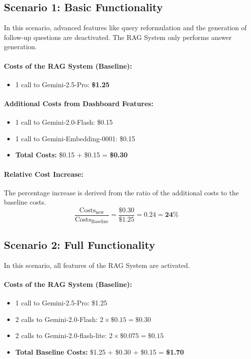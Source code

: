 \documentclass[
	english,
	ruledheaders=section,%
	class=report,%
	thesis={type=bachelor},%
	accentcolor=1b,%
	custommargins=true,%
	marginpar=false,%
	parskip=half-,%
	fontsize=11pt,%
	DIV=14,
]{tudapub}
\begin{document}
\subsection*{Scenario 1: Basic Functionality}
In this scenario, advanced features like query reformulation and the generation of follow-up questions are deactivated. The RAG System only performs answer generation.

\paragraph{Costs of the RAG System (Baseline):}
\begin{itemize}
    \item 1 call to Gemini-2.5-Pro: \textbf{\$1.25}
\end{itemize}

\paragraph{Additional Costs from Dashboard Features:}
\begin{itemize}
    \item 1 call to Gemini-2.0-Flash: \$0.15
    \item 1 call to Gemini-Embedding-0001: \$0.15
    \item \textbf{Total Costs:} \$0.15 + \$0.15 = \textbf{\$0.30}
\end{itemize}

\paragraph{Relative Cost Increase:}
The percentage increase is derived from the ratio of the additional costs to the baseline costs.
\begin{equation*}
\frac{\text{Costs}_\text{new}}{\text{Costs}_\text{Baseline}} = \frac{\$0.30}{\$1.25} = 0.24 = \textbf{24\%}
\end{equation*}
\subsection*{Scenario 2: Full Functionality}
In this scenario, all features of the RAG System are activated.

\paragraph{Costs of the RAG System (Baseline):}
\begin{itemize}
    \item 1 call to Gemini-2.5-Pro: \$1.25
    \item 2 calls to Gemini-2.0-Flash: $2 \times \$0.15 = \$0.30$
    \item 2 calls to Gemini-2.0-flash-lite: $2 \times \$0.075 = \$0.15$
    \item \textbf{Total Baseline Costs:} \$1.25 + \$0.30 + \$0.15 = \textbf{\$1.70}
\end{itemize}
\end{document}
